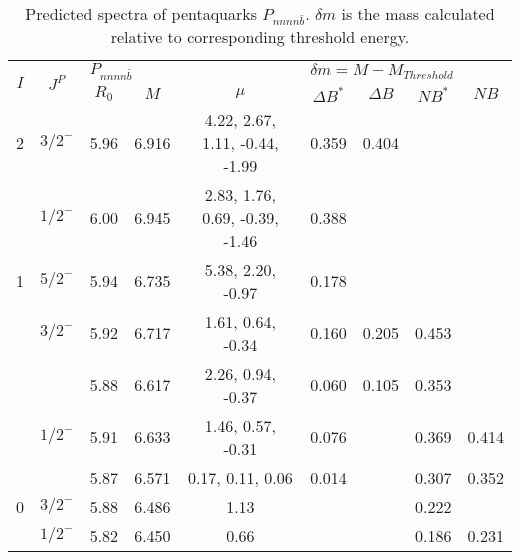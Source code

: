 \documentclass[prd,twocolumn,floatfix,nofootinbib]{revtex4}
\begin{document}
\renewcommand{\tabcolsep}{0.4cm}
\renewcommand{\arraystretch}{1.0}
\begin{table*}[!htbp]
    \caption{Predicted spectra of pentaquarks $P_{nnnn\bar{b}}$.
        $\delta m$ is the mass calculated relative to corresponding threshold energy.}
    \label{tab:nnnnb}
    \begin{tabular}{cc|ccc|cccc}
        \bottomrule[1.5pt]\bottomrule[0.5pt]
        \multirow{2}{*}{$I$} &\multirow{2}{*}{$J^{P}$} 
        &\multicolumn{3}{l|}{$P_{nnnn\bar{b}}$} 
        &\multicolumn{4}{l}{$\delta m=M-M_{Threshold}$} \\
        & &$R_{0}$ &$M$ &$\mu$ &$\Delta B^{\ast}$ &$\Delta B$ &$N B^{\ast}$ &$N B$ \\ \hline
        2
            &${3/2}^{-}$    &5.96   &6.916  &4.22, 2.67, 1.11, -0.44, -1.99 &0.359 &0.404 & & \\
            &${1/2}^{-}$    &6.00   &6.945  &2.83, 1.76, 0.69, -0.39, -1.46 &0.388 & & & \\
        1
            &${5/2}^{-}$    &5.94   &6.735  &5.38, 2.20, -0.97 &0.178 & & & \\
            &${3/2}^{-}$    &5.92   &6.717  &1.61, 0.64, -0.34 &0.160 &0.205 &0.453 & \\
            &               &5.88   &6.617  &2.26, 0.94, -0.37 &0.060 &0.105 &0.353 & \\
            &${1/2}^{-}$    &5.91   &6.633  &1.46, 0.57, -0.31 &0.076 & &0.369 &0.414 \\
            &               &5.87   &6.571  &0.17, 0.11, 0.06 &0.014 & &0.307 &0.352 \\
        0
            &${3/2}^{-}$    &5.88   &6.486  &1.13 & & &0.222 & \\
            &${1/2}^{-}$    &5.82   &6.450  &0.66 & & &0.186 &0.231 \\
        \bottomrule[0.5pt]\bottomrule[1.5pt]
    \end{tabular}
\end{table*}
\end{document}
